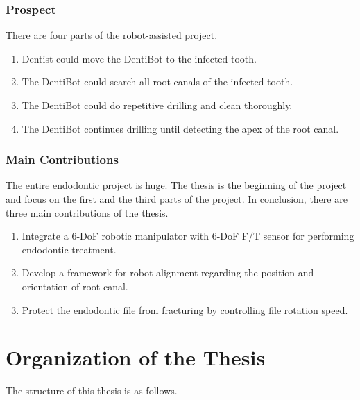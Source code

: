 \subsubsection{Prospect}
\hspace*{6mm}There are four parts of the robot-assisted project. 
\begin{enumerate}
	\item Dentist could move the DentiBot to the infected tooth. 
	\item The DentiBot could search all root canals of the infected tooth.
	\item The DentiBot could do repetitive drilling and clean thoroughly.
	\item The DentiBot continues drilling until detecting the apex of the root canal.
\end{enumerate}	
\subsubsection{Main Contributions}
\hspace*{6mm}The entire endodontic project is huge. The thesis is the beginning of the project and focus on the first and the third parts of the project. In conclusion, there are three main contributions of the thesis.
\begin{enumerate}
	\item	Integrate a 6-DoF robotic manipulator with 6-DoF F/T sensor for performing endodontic treatment.
	\item	Develop a framework for robot alignment regarding the position and orientation of root canal. 
	\item	Protect the endodontic file from fracturing by controlling file rotation speed.
\end{enumerate}
\section{Organization of the Thesis}
\hspace*{6mm}The structure of this thesis is as follows.

